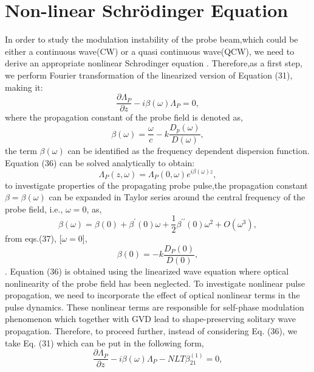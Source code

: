 \documentclass[12pt,a4paper]{article}
\begin{document}
\section{Non-linear Schr\"{o}dinger Equation}
In order to study the modulation instability of the probe beam,which could be either a continuous wave(CW) or a quasi continuous wave(QCW), we need to derive an appropriate nonlinear Schrodinger equation \cite{Scully_Zubairy_1997}. Therefore,as a first step, we perform Fourier transformation of the linearized version of Equation (31), making it:
\begin{equation}
    \frac{\partial\Lambda_P}{\partial z}-i\beta(\omega)\Lambda_P=0,
\end{equation}
where the propagation constant of the probe field is denoted as,
\begin{equation}
    \beta(\omega)=\frac{\omega}{c}-k\frac{D_p(\omega)}{D(\omega)},
\end{equation}
the term \(\beta(\omega)\) can be identified as the frequency dependent dispersion function. Equation (36) can be solved analytically to obtain:
\begin{equation}
    \Lambda_P(z,\omega)=\Lambda_P(0,\omega)e^{i\beta(\omega)z},
\end{equation}
to investigate properties of the propagating probe pulse,the propagation constant \(\beta=\beta(\omega)\) can be expanded in Taylor series around the central frequency of the probe field, i.e., \(\omega=0\), as,
\begin{equation}
    \beta(\omega)=\beta(0)+\beta^\prime(0)\omega+\frac{1}{2}\beta^{\prime\prime}(0)\omega^2+O(\omega^3),
\end{equation}
from eqs.(37), [\(\omega=0\)],
\begin{equation}
    \beta(0)=-k\frac{D_P(0)}{D(0)},
\end{equation}.
Equation (36) is obtained using the linearized wave equation where optical nonlinearity of the probe field has been neglected. To investigate nonlinear pulse propagation, we need to incorporate the effect of optical nonlinear terms in the pulse dynamics. These nonlinear terms are responsible for self-phase modulation phenomenon which together with GVD lead to shape-preserving solitary wave propagation. Therefore, to proceed further, instead of considering Eq. (36), we take Eq. (31) which can be put in the following form,
\begin{equation}
    \frac{\partial\Lambda_P}{\partial z}-i\beta(\omega)\Lambda_P-NLT\beta^{(1)}_{21}=0,
\end{equation}
\end{document}
